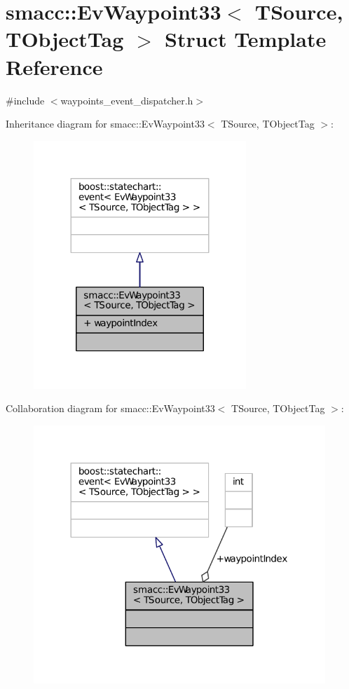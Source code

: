 \hypertarget{structsmacc_1_1EvWaypoint33}{}\section{smacc\+:\+:Ev\+Waypoint33$<$ T\+Source, T\+Object\+Tag $>$ Struct Template Reference}
\label{structsmacc_1_1EvWaypoint33}


{\ttfamily \#include $<$waypoints\+\_\+event\+\_\+dispatcher.\+h$>$}



Inheritance diagram for smacc\+:\+:Ev\+Waypoint33$<$ T\+Source, T\+Object\+Tag $>$\+:
\nopagebreak
\begin{figure}[H]
\begin{center}
\leavevmode
\includegraphics[width=227pt]{structsmacc_1_1EvWaypoint33__inherit__graph}
\end{center}
\end{figure}


Collaboration diagram for smacc\+:\+:Ev\+Waypoint33$<$ T\+Source, T\+Object\+Tag $>$\+:
\nopagebreak
\begin{figure}[H]
\begin{center}
\leavevmode
\includegraphics[width=312pt]{structsmacc_1_1EvWaypoint33__coll__graph}
\end{center}
\end{figure}
